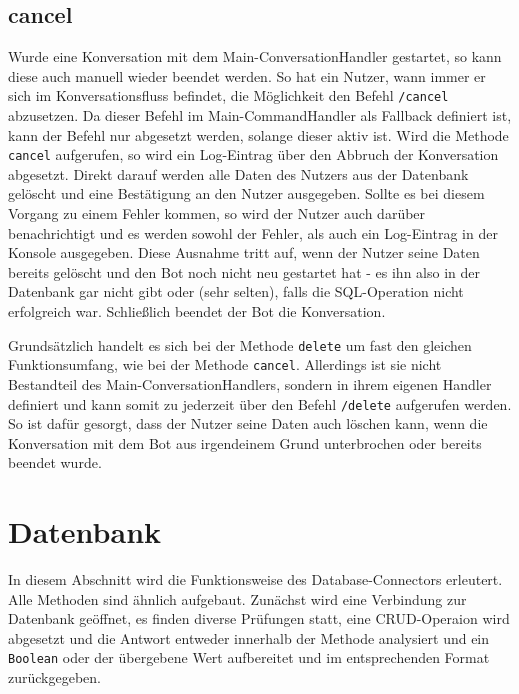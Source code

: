         
        \subsection{cancel} \label{cancel.py}
                Wurde eine Konversation mit dem Main-ConversationHandler gestartet, so kann diese auch manuell wieder beendet werden. So hat ein Nutzer, wann immer er sich im Konversationsfluss befindet, die Möglichkeit den Befehl \verb|/cancel| abzusetzen. Da dieser Befehl im Main-CommandHandler als Fallback definiert ist, kann der Befehl nur abgesetzt werden, solange dieser aktiv ist. Wird die Methode \verb|cancel| aufgerufen, so wird ein Log-Eintrag über den Abbruch der Konversation abgesetzt. Direkt darauf werden alle Daten des Nutzers aus der Datenbank gelöscht und eine Bestätigung an den Nutzer ausgegeben. Sollte es bei diesem Vorgang zu einem Fehler kommen, so wird der Nutzer auch darüber benachrichtigt und es werden sowohl der Fehler, als auch ein Log-Eintrag in der Konsole ausgegeben. Diese Ausnahme tritt auf, wenn der Nutzer seine Daten bereits gelöscht und den Bot noch nicht neu gestartet hat - es ihn also in der Datenbank gar nicht gibt oder (sehr selten), falls die SQL-Operation nicht erfolgreich war.
                Schließlich beendet der Bot die Konversation.

                Grundsätzlich handelt es sich bei der Methode \verb|delete| um fast den gleichen Funktionsumfang, wie bei der Methode \verb|cancel|. Allerdings ist sie nicht Bestandteil des Main-ConversationHandlers, sondern in ihrem eigenen Handler definiert und kann somit zu jederzeit über den Befehl \verb|/delete| aufgerufen werden. So ist dafür gesorgt, dass der Nutzer seine Daten auch löschen kann, wenn die Konversation mit dem Bot aus irgendeinem Grund unterbrochen oder bereits beendet wurde.


    \section{Datenbank} \label{Datenbank}

        In diesem Abschnitt wird die Funktionsweise des Database-Connectors erleutert. Alle Methoden sind ähnlich aufgebaut. Zunächst wird eine Verbindung zur Datenbank geöffnet, es finden diverse Prüfungen statt, eine CRUD-Operaion wird abgesetzt und die Antwort entweder innerhalb der Methode analysiert und ein \verb|Boolean| oder der übergebene Wert aufbereitet und im entsprechenden Format zurückgegeben.
                
